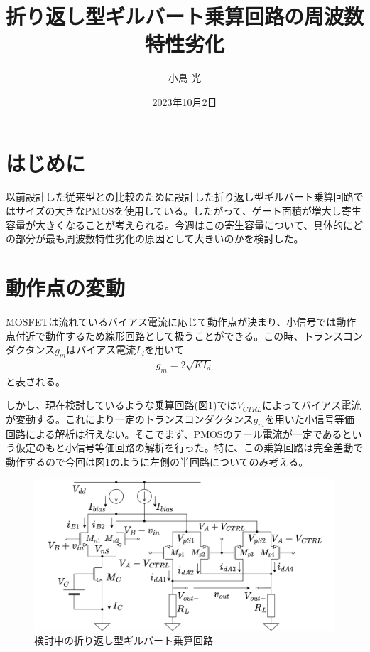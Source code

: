 \documentclass[twocolumn]{jsarticle}
\begin{document}
\title{折り返し型ギルバート乗算回路の周波数特性劣化}
\author{小島 光}
\date{2023年10月2日}
\maketitle

\section{はじめに}
以前設計した従来型との比較のために設計した折り返し型ギルバート乗算回路ではサイズの大きなPMOSを使用している。したがって、ゲート面積が増大し寄生容量が大きくなることが考えられる。今週はこの寄生容量について、具体的にどの部分が最も周波数特性劣化の原因として大きいのかを検討した。

\section{動作点の変動}
MOSFETは流れているバイアス電流に応じて動作点が決まり、小信号では動作点付近で動作するため線形回路として扱うことができる。この時、トランスコンダクタンス$g_{m}$はバイアス電流$I_{d}$を用いて
\begin{align}
    g_{m}=2\sqrt{KI_{d}}\label{eq:gm}
\end{align}
と表される。\par

しかし、現在検討しているような乗算回路(図1)では$V_{CTRL}$によってバイアス電流が変動する。これにより一定のトランスコンダクタンス$g_{m}$を用いた小信号等価回路による解析は行えない。そこでまず、PMOSのテール電流が一定であるという仮定のもと小信号等価回路の解析を行った。特に、この乗算回路は完全差動で動作するので今回は図1のように左側の半回路についてのみ考える。

\begin{figure}[b]
\begin{center}
    \includegraphics*[width=160mm]{figures/folded_gilbert.png}
    \caption{検討中の折り返し型ギルバート乗算回路}
\end{center}
\end{figure}
\end{document}
